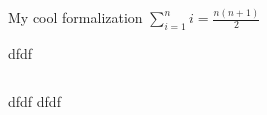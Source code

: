 \documentclass{beamer}
\begin{document}
    \begin{tcolorbox}[colback=blue!5,colframe=blue!75!black,title=My title]
        My cool formalization
        \tcblower
            $\displaystyle\sum\limits_{i=1}^n i = \frac{n(n+1)}{2}$
    \end{tcolorbox}

    \begin{exampleblock}[colframe=blue!75!black]
        dfdf
    \end{exampleblock}
    \begin{columns}
        dfdf
        dfdf
    \end{columns}
\end{document}
